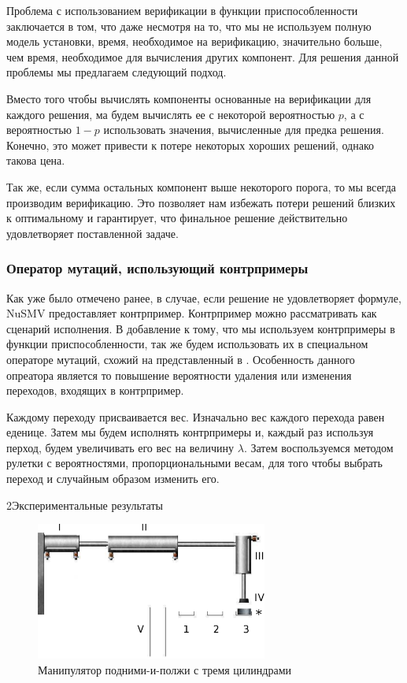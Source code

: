 \documentclass[14pt]{extarticle}
\makeatletter
\theoremstyle{plain}
\theoremstyle{definition}
\renewcommand{\subsection}{\@startsection{subsection}{2}{0mm}%
{2\baselineskip}{\baselineskip}{\bfseries\large\itshape}}
\makeatother
\begin{document}
Проблема с использованием верификации в функции приспособленности заключается
в том, что даже несмотря на то, что мы не используем полную модель установки,
время, необходимое на верификацию, значительно больше, чем время, необходимое
для вычисления других компонент. Для решения данной проблемы мы предлагаем
следующий подход.

Вместо того чтобы вычислять компоненты основанные на верификации для каждого
решения, ма будем вычислять ее с некоторой вероятностью $p$, а с вероятностью
$1 - p$ использовать значения, вычисленные для предка решения. Конечно, это
может привести к потере некоторых хороших решений, однако такова цена.

Так же, если сумма остальных компонент выше некоторого порога, то мы всегда
производим верификацию. Это позволяет нам избежать потери решений близких к
оптимальному и гарантирует, что финальное решение действительно удовлетворяет
поставленной задаче.

\subsubsection{Оператор мутаций, использующий контрпримеры}

Как уже было отмечено ранее, в случае, если решение не удовлетворяет формуле,
NuSMV предоставляет контрпример. Контрпример можно рассматривать как сценарий
исполнения. В добавление к тому, что мы используем контрпримеры в функции
приспособленности, так же будем использовать их в специальном операторе
мутаций, схожий на представленный в \cite{et}. Особенность данного опреатора является то повышение вероятности
удаления или изменения переходов, входящих в контрпример.

Каждому переходу присваивается вес. Изначально вес каждого перехода равен
еденице. Затем мы будем исполнять контрпримеры и, каждый раз используя перход,
будем увеличивать его вес на величину $\lambda$. Затем воспользуемся методом
рулетки с вероятностями, пропорциональными весам, для того чтобы выбрать
переход и случайным образом изменить его.

\subsection{Экспериментальные результаты}

\begin{figure}[t]
    \centering
    \includegraphics[width=3in]{pic/pnp.eps}
    \caption{Манипулятор подними-и-полжи с тремя цилиндрами}
    \label{pnp-system}
\end{figure}
\end{document}
